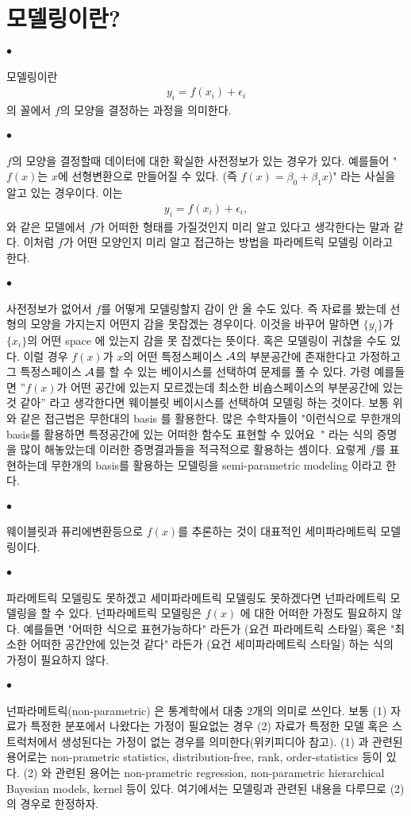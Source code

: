 \documentclass[12pt,oneside,english,a4paper]{article}
\def\ck{\paragraph{\Large$\bullet$}\Large}
\begin{document}
\section{모델링이란?}
\ck 모델링이란 
\begin{align*}
y_i=f(x_i)+\epsilon_i
\end{align*}
의 꼴에서 $f$의 모양을 결정하는 과정을 의미한다. 

\ck $f$의 모양을 결정할때 데이터에 대한 확실한 사전정보가 있는 경우가 있다. 예를들어 
"$f(x)$는 $x$에 선형변환으로 만들어질 수 있다. (즉 $f(x)=\beta_0+\beta_1x$)"
라는 사실을 알고 있는 경우이다. 이는 
\begin{align*}
y_i=f(x_i)+\epsilon_i, 
\end{align*}
와 같은 모델에서 $f$가 어떠한 형태를 가질것인지 미리 알고 있다고 생각한다는 말과 같다. 이처럼 $f$가 어떤 모양인지 미리 알고 접근하는 방법을 파라메트릭 모델링 이라고 한다. 

\ck 사전정보가 없어서 $f$를 어떻게 모델링할지 감이 안 올 수도 있다. 즉 자료를 봤는데 선형의 모양을 가지는지 어떤지 감을 못잡겠는 경우이다. 이것을 바꾸어 말하면 $\{y_i\}$가 $\{x_i\}$의 어떤 space 에 있는지 감을 못 잡겠다는 뜻이다. 혹은 모델링이 귀찮을 수도 있다. 이럴 경우 $f(x)$가 $x$의 어떤 특정스페이스 $\cal A$의 부분공간에 존재한다고 가정하고 그 특정스페이스 $\cal A$를 할 수 있는 베이시스를 선택하여 문제를 풀 수 있다. 가령 예를들면
''$f(x)$가 어떤 공간에 있는지 모르겠는데 최소한 비숍스페이스의 부분공간에 있는것 같아'' 
라고 생각한다면 웨이블릿 베이시스를 선택하여 모델링 하는 것이다. 보통 위와 같은 접근법은 무한대의 basis 를 활용한다. 많은 수학자들이 
"이런식으로 무한개의 basis를 활용하면 특정공간에 있는 어떠한 함수도 표현할 수 있어요~"
라는 식의 증명을 많이 해놓았는데 이러한 증명결과들을 적극적으로 활용하는 셈이다. 요렇게 $f$를 표현하는데 무한개의 basis를 활용하는 모델링을 semi-parametric modeling 이라고 한다. 

\ck 웨이블릿과 퓨리에변환등으로 $f(x)$를 추론하는 것이 대표적인 세미파라메트릭 모델링이다. 

\ck 파라메트릭 모델링도 못하겠고 세미파라메트릭 모델링도 못하겠다면 넌파라메트릭 모델링을 할 수 있다. 넌파라메트릭 모델링은 $f(x)$ 에 대한 어떠한 가정도 필요하지 않다. 예를들면 "어떠한 식으로 표현가능하다" 라든가 (요건 파라메트릭 스타일) 혹은 "최소한 어떠한 공간안에 있는것 같다" 라든가 (요건 세미파라메트릭 스타일) 하는 식의 가정이 필요하지 않다. 

\ck 넌파라메트릭(non-parametric) 은 통계학에서 대충 2개의 의미로 쓰인다. 보통 (1) 자료가 특정한 분포에서 나왔다는 가정이 필요없는 경우 (2) 자료가 특정한 모델 혹은 스트럭처에서 생성된다는 가정이 없는 경우를 의미한다(위키피디아 참고). (1) 과 관련된 용어로는 non-prametric statistics, distribution-free, rank, order-statistics 등이 있다. (2) 와 관련된 용어는 non-prametric regression, non-parametric hierarchical Bayesian models, kernel 등이 있다. 여기에서는 모델링과 관련된 내용을 다루므로 (2)의 경우로 한정하자. 
\end{document}
